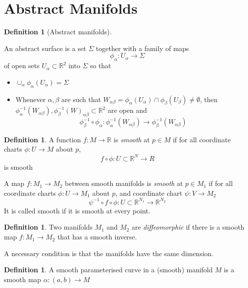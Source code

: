 \documentclass[10pt, oneside, reqno]{amsart}
\newcommand{\R}{\mathbb{R}}
\theoremstyle{plain}%
\theoremstyle{definition}
\newtheorem{defn}[thm]{Definition}
\theoremstyle{remark}
\begin{document}
\section{Abstract Manifolds}

\begin{defn}[Abstract manifolds]
	
\end{defn}
An abstract surface is a set $\Sigma$ together with a family of maps \[
	\phi_\alpha: U_\alpha \rightarrow \Sigma
\] of open sets $U_\alpha \subset \R^2$ into $\Sigma$ so that

\begin{itemize}

	\item $\cup_\alpha \phi_\alpha(U_\alpha) = \Sigma$


	\item Whenever $\alpha, \beta$ are such that $W_{\alpha \beta} = \phi_\alpha (U_\alpha) \cap \phi_\beta (U_\beta) \neq \emptyset$, then $\phi^{-1}_\alpha (W_{\alpha \beta}), \phi^{-1}_\beta (W)_{\alpha \beta} \subset \R^2$ are open and
  \[
 	\phi^{-1}_\beta \circ \phi_\alpha : \phi^{-1}_\alpha (W_{\alpha \beta}) \rightarrow \phi^{-1}_\beta (W_{\alpha \beta})
 \]

\end{itemize}

\begin{defn}
	A function $f: M \rightarrow \R$ is \emph{smooth} at $p \in M$ if for all coordinate charts $\phi: U \rightarrow M$ about $p$, \[
		f \circ \phi : U \subset \R^N \rightarrow R
	\] is smooth
	
	A map $f : M_1 \rightarrow M_2$ between smooth manifolds is \emph{smooth} at $p \in M_1$ if for all coordinate charts $\phi : U \rightarrow M_1$ about $p$, and coordinate chart $\psi : V \rightarrow M_2$\[
		\psi^{-1} \circ f \circ \phi : U \subset \R^{N_1} \rightarrow \R^{N_2}
	\]
	It is called smooth if it is smooth at every point.

\end{defn}

\begin{defn}
	Two manifolds $M_1$ and $M_2$ are \emph{diffeomorphic} if there is a smooth map $f: M_1 \rightarrow M_2$ that has a smooth inverse.
	
	A necessary condition is that the manifolds have the same dimension.
\end{defn}

\begin{defn}
	A smooth parameterised curve in a (smooth) manifold $M$ is a smooth map $\alpha : (a,b) \rightarrow M$
\end{defn}
\end{document}
